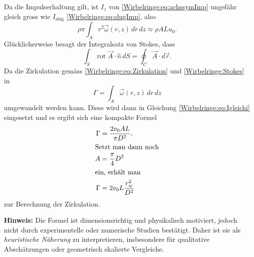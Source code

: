 Da die Impulserhaltung gilt, ist \(I_z\) von \eqref{Wirbelringe:eq:achssymImp} ungefähr gleich gross wie \(I_{\text{slug}}\) \eqref{Wirbelringe:eq:slugImp}, also
\begin{equation}
    \rho\pi\int_{A}r^2\vec{\omega}(r,z)\,dr\,dz
    \approx
    \rho ALu_0
    \label{Wirbelringe:eq:Igleichi}.
\end{equation}
Glücklicherweise besagt der Integralsatz von Stokes, dass
\begin{equation*}
    \int_{S}\operatorname{rot}\vec{A}\cdot\hat{n}\,dS 
    =
    \oint_{C}\vec{A}\cdot d\vec{r}.
\end{equation*}
Da die Zirkulation gemäss \eqref{Wirbelringe:eq:Zirkulation} und \ref{Wirbelringe:Stokes} in
\begin{equation*}
    \Gamma
    =
    \int_{A}\vec{\omega}(r,z)\,dr\,dz
\end{equation*}
umgewandelt werden kann.
Diese wird dann in Gleichung \eqref{Wirbelringe:eq:Igleichi} eingesetzt und es ergibt sich eine kompakte Formel
\begin{align*}
    \Gamma
    &=
    \frac{2v_0AL}{\pi D^2},\\
    \intertext{Setzt man dann noch} 
    A
    &=
    \frac{\pi}{4} D^2\\
    \intertext{ein, erhält man }
    \label{Wirbelringe:eq:naeherungZirkulation}
    \Gamma
    &=
    2v_0L\frac{r_w^2}{D^2}
\end{align*}
zur Berechnung der Zirkulation.

\textbf{Hinweis:}
Die Formel ist dimensionsrichtig und physikalisch motiviert, jedoch nicht durch experimentelle oder numerische Studien bestätigt.
Daher ist sie als \emph{heuristische Näherung} zu interpretieren, insbesondere für qualitative Abschätzungen oder geometrisch skalierte Vergleiche.